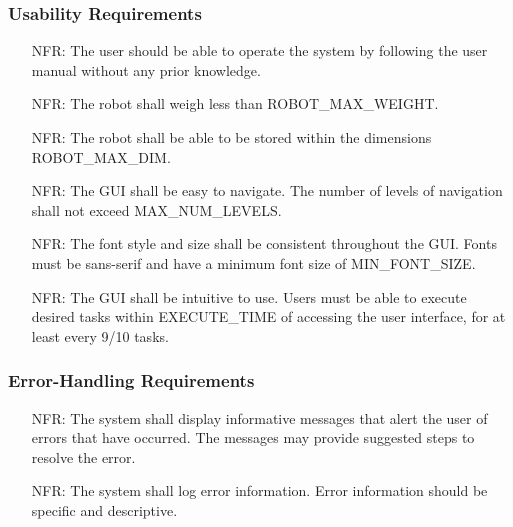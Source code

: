 \documentclass[12pt]{article}
\newcounter{nfrnum} %
\begin{document}
\subsubsection{Usability Requirements}

\noindent \begin{itemize}
\item[NFR\refstepcounter{nfrnum}\thenfrnum \label{NFR_Usability1}:] The user should be able to operate the system by following the user manual without any prior knowledge.
\item[NFR\refstepcounter{nfrnum}\thenfrnum \label{NFR_Usability2}:] The robot shall weigh less than ROBOT\_MAX\_WEIGHT.
\item[NFR\refstepcounter{nfrnum}\thenfrnum \label{NFR_Usability3}:] The robot shall be able to be stored within the dimensions ROBOT\_MAX\_DIM.
\item[NFR\refstepcounter{nfrnum}\thenfrnum \label{NFR_Usability4}:] The GUI shall be easy to navigate. The number of levels of navigation shall not exceed MAX\_NUM\_LEVELS.
\item[NFR\refstepcounter{nfrnum}\thenfrnum \label{NFR_Usability5}:] The font style and size shall be consistent throughout the GUI. Fonts must be sans-serif and have a minimum font size of MIN\_FONT\_SIZE.
\item[NFR\refstepcounter{nfrnum}\thenfrnum \label{NFR_Usability6}:] The GUI shall be intuitive to use. Users must be able to execute desired tasks within EXECUTE\_TIME of accessing the user interface, for at least every 9/10 tasks.
\end{itemize}

\subsubsection{Error-Handling Requirements}
\noindent \begin{itemize}
\item[NFR\refstepcounter{nfrnum}\thenfrnum \label{NFR_Errors1}:] The system shall display informative messages that alert the user of errors that have occurred. The messages may provide suggested steps to resolve the error.
\item[NFR\refstepcounter{nfrnum}\thenfrnum \label{NFR_Errors2}:] The system shall log error information. Error information should be specific and descriptive.
\end{itemize}
\end{document}

